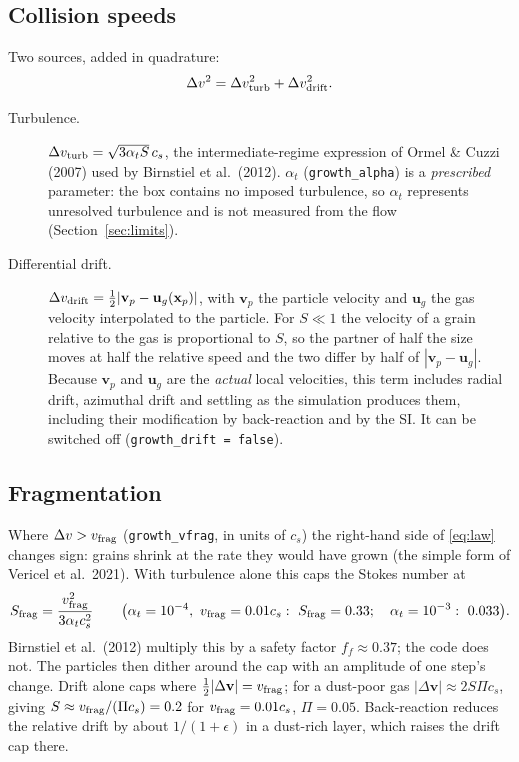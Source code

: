 \documentclass[11pt]{article}
\newcommand{\code}[1]{\texttt{#1}}
\newcommand{\St}{S}
\newcommand{\vf}{v_{\rm frag}}
\begin{document}
\subsection{Collision speeds}
Two sources, added in quadrature:
\begin{equation}
  \Delta v^2 = \Delta v_{\rm turb}^2 + \Delta v_{\rm drift}^2 .
\end{equation}
\begin{description}
\item[Turbulence.] $\Delta v_{\rm turb}=\sqrt{3\alpha_t\St}\,c_s$, the
  intermediate-regime expression of Ormel \& Cuzzi (2007) used by Birnstiel et al.\
  (2012). $\alpha_t$ (\code{growth\_alpha}) is a \emph{prescribed} parameter: the box
  contains no imposed turbulence, so $\alpha_t$ represents unresolved turbulence and is
  not measured from the flow (Section~\ref{sec:limits}).
\item[Differential drift.] $\Delta v_{\rm drift}=\frac12|\mathbf v_p-\mathbf
  u_g(\mathbf x_p)|$, with $\mathbf v_p$ the particle velocity and $\mathbf u_g$ the gas
  velocity interpolated to the particle. For $\St\ll1$ the velocity of a grain relative
  to the gas is proportional to $\St$, so the partner of half the size moves at half the
  relative speed and the two differ by half of $|\mathbf v_p-\mathbf u_g|$. Because
  $\mathbf v_p$ and $\mathbf u_g$ are the \emph{actual} local velocities, this term
  includes radial drift, azimuthal drift and settling as the simulation produces them,
  including their modification by back-reaction and by the SI. It can be switched off
  (\code{growth\_drift = false}).
\end{description}

\subsection{Fragmentation}
Where $\Delta v>\vf$ (\code{growth\_vfrag}, in units of $c_s$) the right-hand side of
\eqref{eq:law} changes sign: grains shrink at the rate they would have grown (the
simple form of Vericel et al.\ 2021). With turbulence alone this caps the Stokes number
at
\begin{equation}
  \St_{\rm frag} = \frac{\vf^2}{3\alpha_t c_s^2}\qquad
  \bigl(\alpha_t=10^{-4},\ \vf=0.01c_s:\ \St_{\rm frag}=0.33;\quad
  \alpha_t=10^{-3}:\ 0.033\bigr).
\end{equation}
Birnstiel et al.\ (2012) multiply this by a safety factor $f_f\approx0.37$; the code
does not. The particles then dither around the cap with an amplitude of one step's
change. Drift alone caps where $\frac12|\Delta\mathbf v|=\vf$; for a dust-poor gas
$|\Delta\mathbf v|\approx2\St\Pi c_s$, giving $\St\approx\vf/(\Pi c_s)=0.2$ for
$\vf=0.01c_s$, $\Pi=0.05$. Back-reaction reduces the relative drift by about
$1/(1+\epsilon)$ in a dust-rich layer, which raises the drift cap there.
\end{document}
